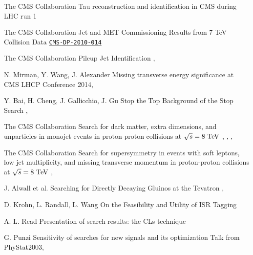 {The CMS Collaboration}
{Tau reconstruction and identification in CMS during LHC run 1}
{}

{The CMS Collaboration}
{Jet and MET Commissioning Results from 7 TeV Collision Data}
{\href{http://cms.cern.ch/iCMS/jsp/openfile.jsp?type=DP&year=2010&files=DP2010_014.pdf}{\texttt{CMS-DP-2010-014}}}

{The CMS Collaboration}
{Pileup Jet Identification}
{, }


{N. Mirman, Y. Wang, J. Alexander}
{Missing transverse energy significance at CMS}
{LHCP Conference 2014, }

{Y. Bai, H. Cheng, J. Gallicchio, J. Gu}
{Stop the Top Background of the Stop Search}
{, }


{The CMS Collaboration}
{Search for dark matter, extra dimensions, and unparticles in monojet events in proton-proton collisions at $\sqrt{s} = 8~\text{TeV}$}
{, , , }

{The CMS Collaboration}
{Search for supersymmetry in events with soft leptons, low jet multiplicity, and missing
transverse momentum in proton-proton collisions at $\sqrt{s} = 8~\text{TeV}$}
{, }

{J. Alwall et al.}
{Searching for Directly Decaying Gluinos at the Tevatron}
{, }

{D. Krohn, L. Randall, L. Wang}
{On the Feasibility and Utility of ISR Tagging}
{}


{A. L. Read}
{Presentation of search results: the CLs technique}
{}

{G. Punzi}
{Sensitivity of searches for new signals and its optimization}
{Talk from PhyStat2003, }

